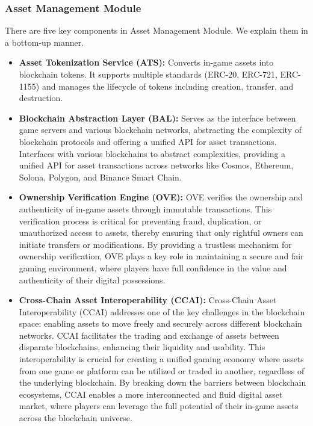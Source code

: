 \subsubsection{Asset Management Module} 
There are five key components in Asset Management Module. We explain them in a bottom-up manner.
\begin{itemize}
    \item  \textbf{Asset Tokenization Service (ATS):} Converts in-game assets into blockchain tokens. It supports multiple standards (ERC-20, ERC-721, ERC-1155) and manages the lifecycle of tokens including creation, transfer, and destruction.
  \item \textbf{Blockchain Abstraction Layer (BAL):} Serves as the interface between game servers and various blockchain networks, abstracting the complexity of blockchain protocols and offering a unified API for asset transactions.  Interfaces with various blockchains to abstract complexities, providing a unified API for asset transactions across networks like Cosmos, Ethereum, Solona, Polygon, and Binance Smart Chain.
  \item \textbf{Ownership Verification Engine (OVE):} OVE verifies the ownership and authenticity of in-game assets through immutable transactions. This verification process is critical for preventing fraud, duplication, or unauthorized access to assets, thereby ensuring that only rightful owners can initiate transfers or modifications. By providing a trustless mechanism for ownership verification, OVE plays a key role in maintaining a secure and fair gaming environment, where players have full confidence in the value and authenticity of their digital possessions.
  \item \textbf{Cross-Chain Asset Interoperability (CCAI):} Cross-Chain Asset Interoperability (CCAI) addresses one of the key challenges in the blockchain space: enabling assets to move freely and securely across different blockchain networks. CCAI facilitates the trading and exchange of assets between disparate blockchains, enhancing their liquidity and usability. This interoperability is crucial for creating a unified gaming economy where assets from one game or platform can be utilized or traded in another, regardless of the underlying blockchain. By breaking down the barriers between blockchain ecosystems, CCAI enables a more interconnected and fluid digital asset market, where players can leverage the full potential of their in-game assets across the blockchain universe.
\end{itemize}

